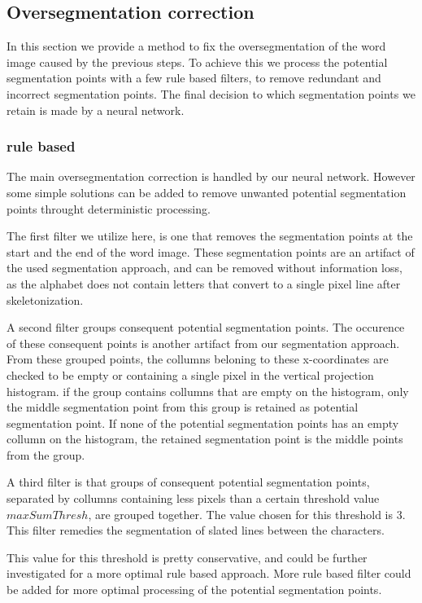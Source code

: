 \documentclass{article}
\begin{document}
\subsection{Oversegmentation correction}
In this section we provide a method to fix the oversegmentation of the word image caused by the previous steps.
To achieve this we process the potential segmentation points with a few rule based filters, to remove redundant and incorrect segmentation points.
The final decision to which segmentation points we retain is made by a neural network.

\subsubsection{rule based}
The main oversegmentation correction is handled by our neural network.
However some simple solutions can be added to remove unwanted potential segmentation points throught deterministic processing.

The first filter we utilize here, is one that removes the segmentation points at the start and the end of the word image.
These segmentation points are an artifact of the used segmentation approach, and can be removed without information loss, as the alphabet does not contain letters that convert to a single pixel line after skeletonization.

A second filter groups consequent potential segmentation points.
The occurence of these consequent points is another artifact from our segmentation approach.
From these grouped points, the collumns beloning to these x-coordinates are checked to be empty or containing a single pixel in the vertical projection histogram.
if the group contains collumns that are empty on the histogram, only the middle segmentation point from this group is retained as potential segmentation point.
If none of the potential segmentation points has an empty collumn on the histogram, the retained segmentation point is the middle points from the group.

A third filter is that groups of consequent potential segmentation points, separated by collumns containing less pixels than a certain threshold value $maxSumThresh$, are grouped together.
The value chosen for this threshold is 3.
This filter remedies the segmentation of slated lines between the characters.

This value for this threshold is pretty conservative, and could be further investigated for a more optimal rule based approach.
More rule based filter could be added for more optimal processing of the potential segmentation points.
\end{document}
